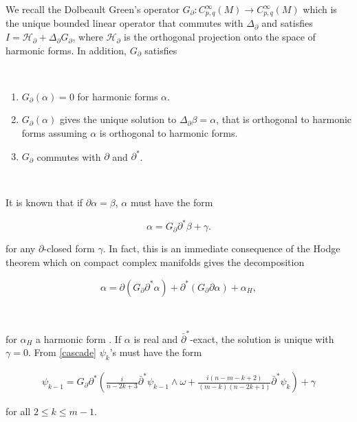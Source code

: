 \documentclass[11pt,letterpaper]{amsart}
\newcommand{\sbpartial}{\bar{\partial}^*}
\newcommand{\spartial}{\partial^*}
\numberwithin{equation}{section}
\begin{document}
We recall the Dolbeault Green's operator $G_\partial : C^\infty_{p,q}(M) \to C^\infty_{p,q}(M)$ which is the unique bounded linear operator that commutes with $\Delta_\partial$ and satisfies $I = \mathcal{H}_\partial + \Delta_\partial G_\partial$, where $\mathcal{H}_\partial$ is the orthogonal projection onto the space of harmonic forms. In addition, $G_{\partial}$ satisfies

\

\begin{enumerate}
    \item $G_{\partial}(\alpha) = 0$ for harmonic forms $\alpha$.
    \item $G_{\partial}(\alpha)$ gives the unique solution to $\Delta_{\partial} \beta = \alpha$, that is orthogonal to harmonic forms assuming $\alpha$ is orthogonal to harmonic forms. 

    \item $G_{\partial}$ commutes with $\partial$ and $\spartial$.
\end{enumerate}

\

It is known that if $\partial \alpha = \beta$, $\alpha$ must have the form

\begin{equation}
    \alpha = G_{\partial} \partial^* \beta + \gamma.
\end{equation}

\noindent for any $\partial$-closed form $\gamma$. In fact, this is an immediate consequence of the Hodge theorem which on compact complex manifolds gives the decomposition

$$\alpha = \partial (G_{\partial} \spartial \alpha) + \spartial(G_{\partial} \partial \alpha) + \alpha_{H},$$

\

\noindent for $\alpha_H$ a harmonic form \cite[Chapter $0$]{Griffiths-Harris}. If $\alpha$ is real and $\sbpartial$-exact, the solution is unique with $\gamma =0$. From \eqref{cascade} $\psi_{k}$'s must have the form

\begin{equation}\label{dbar-problem}
    \begin{aligned}
         \psi_{k-1} = G_{\partial} \partial^*\left( \frac{i}{n-2k+ 3} \sbpartial \psi_{k-1} \wedge \omega + \frac{i(n-m-k+2)}{(m-k)(n-2k+1)}\sbpartial \psi_{k} \right) + \gamma
    \end{aligned}
\end{equation}

\noindent for all $2 \leq k \leq m-1$.
\end{document}
